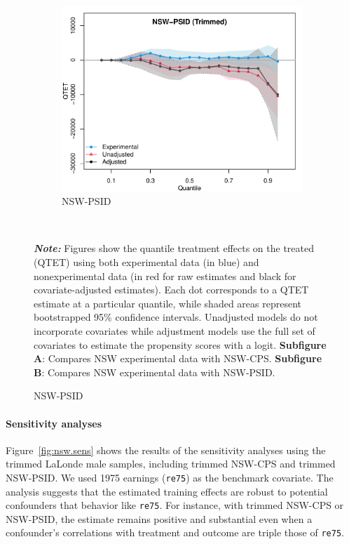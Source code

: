 \documentclass[letterpaper,12pt,leqno]{article}
\begin{document}
\begin{figure}[!ht]
\begin{minipage}[c]{1\textwidth}
\begin{subfigure}{1\linewidth}
            \includegraphics[width=0.45\linewidth]{qte_nsw_psid_trim.pdf}
            \caption{NSW-PSID}
        \end{subfigure}
    \end{minipage}%
    \\\raggedright
     {\footnotesize\textbf{\textit{Note:}} Figures show the quantile treatment effects on the treated (QTET) using both experimental data (in blue) and nonexperimental data (in red for raw estimates and black for covariate-adjusted estimates). Each dot corresponds to a QTET estimate at a particular quantile, while shaded areas represent bootstrapped 95\% confidence intervals. Unadjusted models do not incorporate covariates while adjustment models use the full set of covariates to estimate the propensity scores with a logit. \textbf{Subfigure A}: Compares NSW experimental data with NSW-CPS. \textbf{Subfigure B}: Compares NSW experimental data with NSW-PSID.}
\end{figure}
\clearpage


\paragraph{Sensitivity analyses} Figure~\ref{fig:nsw.sens} shows the results of the sensitivity analyses using the trimmed LaLonde male samples, including trimmed NSW-CPS and trimmed NSW-PSID. We used 1975 earnings (\texttt{re75}) as the benchmark covariate. The analysis suggests that the estimated training effects are robust to potential confounders that behavior like \texttt{re75}. For instance, with trimmed NSW-CPS or NSW-PSID, the estimate remains positive and substantial even when a confounder's correlations with treatment and outcome are triple those of \texttt{re75}.
\end{document}
